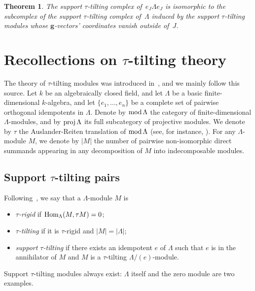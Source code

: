 \documentclass{amsart}
\newtheorem{theorem}{Theorem}%
\theoremstyle{definition}
\renewcommand{\b}[1]{\mathbf{#1}} %
\newcommand{\darkblue}{\color{darkblue}} %
\newcommand{\defn}[1]{\textsl{\darkblue #1}} %
\newcommand{\MOD}{\mbox{{\rm mod \!}}}
\newcommand{\proj}{\operatorname{{\rm proj }}}
\newcommand{\Hom}[1]{\operatorname{{\rm Hom}}_{#1}}
\begin{document}
\begin{theorem}
\label{thm:mainAlgThm}
The support $\tau$-tilting complex of~$e_J \Lambda e_J$ is isomorphic to the subcomplex of the support $\tau$-tilting complex of~$\Lambda$ induced by the support $\tau$-tilting modules whose $\b{g}$-vectors' coordinates vanish outside of~$J$.
\end{theorem}


\section{Recollections on $\tau$-tilting theory}
\label{sec:recollections}

The theory of $\tau$-tilting modules was introduced in~\cite{AdachiIyamaReiten}, and we mainly follow this source.
Let $k$ be an algebraically closed field, and let $\Lambda$ be a basic finite-dimensional $k$-algebra, 
and let $\{e_1, \dots, e_n\}$ be a complete set of pairwise orthogonal idempotents in $\Lambda$.
Denote by $\MOD \Lambda$ the category of finite-dimensional $\Lambda$-modules, 
and by $\proj \Lambda$ its full subcategory of projective modules.
We denote by $\tau$ the Auslander-Reiten translation of $\MOD \Lambda$ (see, for instance, \cite[Chapter IV]{AssemSimsonSkowronski}).
For any $\Lambda$-module $M$, we denote by $|M|$ the number of pairwise non-isomorphic direct summands appearing 
in any decomposition of $M$ into indecomposable modules.


\subsection{Support $\tau$-tilting pairs}

Following~\cite[Def.~0.1]{AdachiIyamaReiten}, we say that a $\Lambda$-module $M$ is 
\begin{itemize}
 \item \defn{$\tau$-rigid} if $\Hom{\Lambda}(M, \tau M) = 0$;
 \item \defn{$\tau$-tilting} if it is $\tau$-rigid and $|M|=|\Lambda|$;
 \item \defn{support $\tau$-tilting} if there exists an idempotent $e$ of $\Lambda$ such that
       $e$ is in the annihilator of $M$ and $M$ is a $\tau$-tilting $\Lambda/(e)$-module.
\end{itemize}
Support $\tau$-tilting modules always exist: $\Lambda$ itself and the zero module are two examples.
\end{document}
